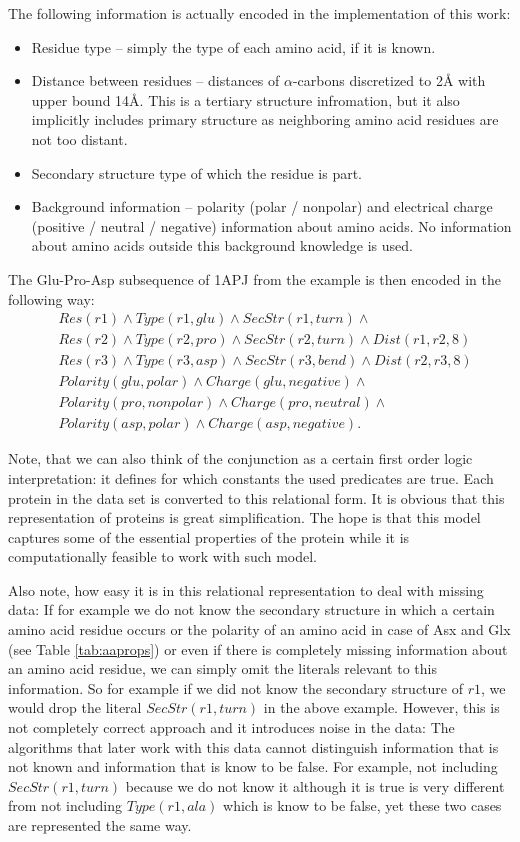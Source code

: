 \documentclass[11pt,twoside,a4paper]{book}
\begin{document}
The following information is actually encoded in the implementation of this work:
\begin{itemize}
 \item Residue type -- simply the type of each amino acid, if it is known.
 \item Distance between residues -- distances of $\alpha$-carbons discretized to 2Å with upper bound 14Å.
 This is a tertiary structure infromation, but it also implicitly includes primary structure 
 as neighboring amino acid residues are not too distant.
 \item Secondary structure type of which the residue is part.
 \item Background information -- polarity (polar / nonpolar) and electrical charge (positive / neutral / negative)
 information about amino acids.
 No information about amino acids outside this background knowledge is used.
\end{itemize}

The Glu-Pro-Asp subsequence of 1APJ from the example is then encoded in the following way:
\begin{align*}
&Res(r1) \land Type(r1, glu) \land SecStr(r1, turn) \land \\
&Res(r2) \land Type(r2, pro) \land SecStr(r2, turn) \land Dist(r1, r2, 8) \\
&Res(r3) \land Type(r3, asp) \land SecStr(r3, bend) \land Dist(r2, r3, 8) \\
&Polarity(glu, polar) \land Charge(glu, negative) \land \\
&Polarity(pro, nonpolar) \land Charge(pro, neutral) \land \\
&Polarity(asp, polar) \land Charge(asp, negative).
\end{align*}

Note, that we can also think of the conjunction as a certain first order logic interpretation:
it defines for which constants the used predicates are true.
Each protein in the data set is converted to this relational form.
It is obvious that this representation of proteins is great simplification.
The hope is that this model captures some of the essential properties of the 
protein while it is computationally feasible to work with such model.

Also note, how easy it is in this relational representation to deal with missing data:
If for example we do not know the secondary structure in which a certain amino acid 
residue occurs or the polarity of an amino acid in case of Asx and Glx (see Table \ref{tab:aaprops})
or even if there is completely missing information about an amino acid residue,
we can simply omit the literals relevant to this information.
So for example if we did not know the secondary structure of $r1$,
we would drop the literal $SecStr(r1, turn)$ in the above example.
However, this is not completely correct approach and it introduces noise in the data:
The algorithms that later work with this data cannot distinguish information
that is not known and information that is know to be false.
For example,
not including $SecStr(r1, turn)$ because we do not know it although it is true
is very different from not including $Type(r1, ala)$ which is know to be false,
yet these two cases are represented the same way.
\end{document}
